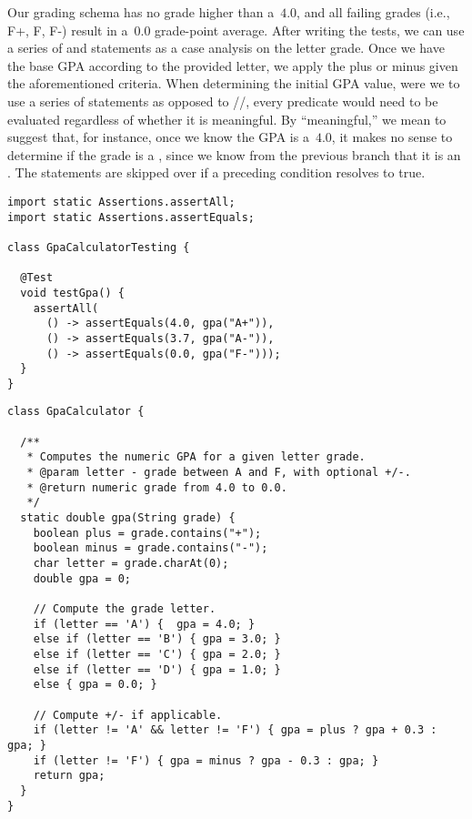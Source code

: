 Our grading schema has no grade higher than a~$4.0$, and all failing grades (i.e., F+, F, F-) result in a~$0.0$ grade-point average. 
After writing the tests, we can use a series of  and  statements as a case analysis on the letter grade. 
Once we have the base GPA according to the provided letter, we apply the plus or minus given the aforementioned criteria. 
When determining the initial GPA value, were we to use a series of  statements as opposed to //, every predicate would need to be evaluated regardless of whether it is meaningful. 
By ``meaningful,'' we mean to suggest that, for instance, once we know the GPA is a~$4.0$, it makes no sense to determine if the grade is a , since we know from the previous branch that it is an . 
The  statements are skipped over if a preceding condition resolves to true.

\begin{lstlisting}[language=MyJava]
import static Assertions.assertAll;
import static Assertions.assertEquals;

class GpaCalculatorTesting {

  @Test
  void testGpa() {
    assertAll(
      () -> assertEquals(4.0, gpa("A+")),
      () -> assertEquals(3.7, gpa("A-")),
      () -> assertEquals(0.0, gpa("F-")));
  }
}
\end{lstlisting}

\begin{lstlisting}[language=MyJava]
class GpaCalculator {

  /**
   * Computes the numeric GPA for a given letter grade.
   * @param letter - grade between A and F, with optional +/-.
   * @return numeric grade from 4.0 to 0.0.
   */
  static double gpa(String grade) {
    boolean plus = grade.contains("+");
    boolean minus = grade.contains("-");
    char letter = grade.charAt(0);
    double gpa = 0;
    
    // Compute the grade letter.
    if (letter == 'A') {  gpa = 4.0; } 
    else if (letter == 'B') { gpa = 3.0; } 
    else if (letter == 'C') { gpa = 2.0; } 
    else if (letter == 'D') { gpa = 1.0; } 
    else { gpa = 0.0; }
    
    // Compute +/- if applicable.
    if (letter != 'A' && letter != 'F') { gpa = plus ? gpa + 0.3 : gpa; }
    if (letter != 'F') { gpa = minus ? gpa - 0.3 : gpa; }
    return gpa;
  }
}
\end{lstlisting}

